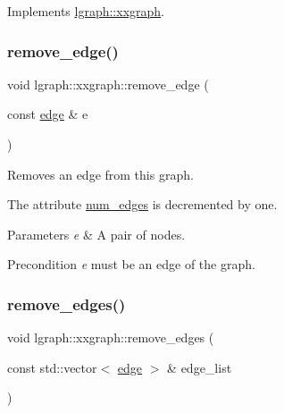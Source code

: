 Implements \hyperlink{classlgraph_1_1xxgraph_a7fd3a1309cde4f408c8d9d4cb3b898a8}{lgraph\+::xxgraph}.

\mbox{\label{classlgraph_1_1xxgraph_a46a75fa2a10a8674ab930e9dc766e2f9}} 
\subsubsection{\texorpdfstring{remove\+\_\+edge()}{remove\_edge()}\hspace{0.1cm}{\footnotesize\ttfamily [2/2]}}
{\footnotesize\ttfamily void lgraph\+::xxgraph\+::remove\+\_\+edge (\begin{DoxyParamCaption}\item[{const \hyperlink{namespacelgraph_a76bd7d50719f03de7a85db259d80d572}{edge} \&}]{e }\end{DoxyParamCaption})\hspace{0.3cm}{\ttfamily [inherited]}}



Removes an edge from this graph. 

The attribute \hyperlink{classlgraph_1_1xxgraph_a6765a9a3be42f6e0f824635c593b35d7}{num\+\_\+edges} is decremented by one. 
\begin{DoxyParams}{Parameters}
{\em e} & A pair of nodes. \\
\hline
\end{DoxyParams}
\begin{DoxyPrecond}{Precondition}
{\itshape e} must be an edge of the graph. 
\end{DoxyPrecond}
\mbox{\label{classlgraph_1_1xxgraph_aef7c4bf62f3f4db362b2d3accb3b6d3d}} 
\subsubsection{\texorpdfstring{remove\+\_\+edges()}{remove\_edges()}}
{\footnotesize\ttfamily void lgraph\+::xxgraph\+::remove\+\_\+edges (\begin{DoxyParamCaption}\item[{const std\+::vector$<$ \hyperlink{namespacelgraph_a76bd7d50719f03de7a85db259d80d572}{edge} $>$ \&}]{edge\+\_\+list }\end{DoxyParamCaption})\hspace{0.3cm}{\ttfamily [inherited]}}



